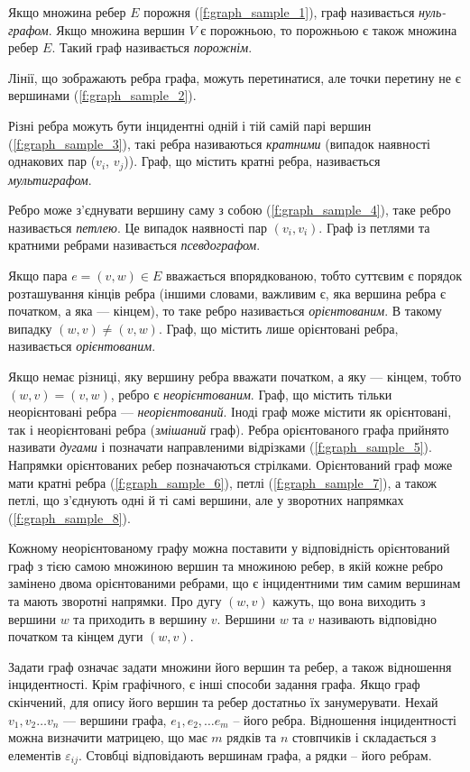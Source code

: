 Якщо множина ребер $E$ порожня (\ref{f:graph_sample_1}), граф називається \emph{нуль-графом}. Якщо
множина вершин $V$ є порожньою, то порожньою є також множина ребер $E$. Такий граф називається
\emph{порожнім}.

Лінії, що зображають ребра графа, можуть перетинатися, але точки перетину не є
вершинами (\ref{f:graph_sample_2}).

Різні ребра можуть бути інцидентні одній і тій самій парі вершин (\ref{f:graph_sample_3}), такі ребра
називаються \emph{кратними} (випадок наявності однакових пар ($v_i$, $v_j$)). Граф, що містить
кратні ребра, називається \emph{мультиграфом}.

Ребро може з'єднувати вершину саму з собою (\ref{f:graph_sample_4}), таке ребро називається
\emph{петлею}. Це випадок наявності пар $(v_i, v_i)$. Граф із петлями та кратними ребрами
називається \emph{псевдографом}.

Якщо пара $e = (v, w) \in E$ вважається впорядкованою, тобто суттєвим є порядок розташування кінців
ребра (іншими словами, важливим є, яка вершина ребра є початком, а яка --- кінцем), то таке ребро
називається \emph{орієнтованим}. В такому випадку $(w, v) \neq (v, w)$. Граф, що містить лише
орієнтовані ребра, називається \emph{орієнтованим}.

Якщо немає різниці, яку вершину ребра вважати початком, а яку --- кінцем, тобто
$(w, v) = (v, w)$, ребро є \emph{неорієнтованим}. Граф, що містить тільки неорієнтовані
ребра --- \emph{неорієнтований}. Іноді граф може містити як орієнтовані, так і неорієнтовані ребра
(\emph{змішаний} граф). Ребра орієнтованого графа прийнято називати \emph{дугами} і позначати
направленими відрізками (\ref{f:graph_sample_5}). Напрямки орієнтованих ребер позначаються
стрілками. Орієнтований граф може мати кратні ребра (\ref{f:graph_sample_6}), петлі
(\ref{f:graph_sample_7}), а також петлі, що з'єднують одні й ті самі вершини, але у зворотних
напрямках (\ref{f:graph_sample_8}).

Кожному неорієнтованому графу можна поставити у відповідність орієнтований граф з тією самою
множиною вершин та множиною ребер, в якій кожне ребро замінено двома орієнтованими ребрами, що є
інцидентними тим самим вершинам та мають зворотні напрямки. Про дугу $(w, v)$ кажуть, що вона
виходить з вершини $w$ та приходить в вершину $v$.  Вершини $w$ та $v$ називають відповідно початком
та кінцем дуги $(w, v)$.

Задати граф означає задати множини його вершин та ребер, а також відношення інцидентності. Крім
графічного, є інші способи задання графа.  Якщо граф скінчений, для опису його вершин та ребер
достатньо їх занумерувати. Нехай $v_1, v_2 \ldots v_n$ --- вершини графа, $e_1, e_2, \ldots e_m$ --
його ребра. Відношення інцидентності можна визначити матрицею, що має $m$ рядків та $n$
стовпчиків і складається з елементів $\varepsilon_{ij}$. Стовбці відповідають вершинам
графа, а рядки -- його ребрам.


